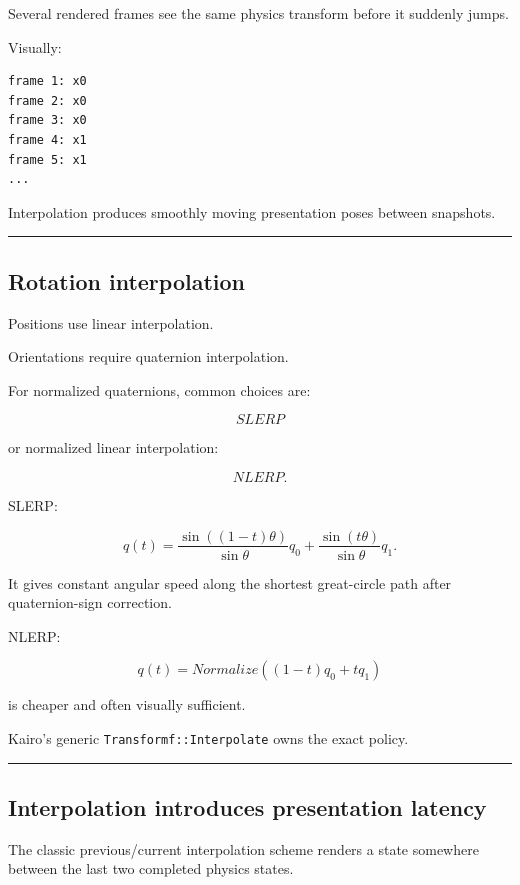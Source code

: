 Several rendered frames see the same physics transform before it suddenly jumps.

Visually:

\begin{verbatim}
frame 1: x0
frame 2: x0
frame 3: x0
frame 4: x1
frame 5: x1
...
\end{verbatim}

Interpolation produces smoothly moving presentation poses between snapshots.

\begin{center}\rule{0.5\linewidth}{0.5pt}\end{center}

\subsection{Rotation interpolation}\label{06-engine-ii-ch037-rotation-interpolation}

Positions use linear interpolation.

Orientations require quaternion interpolation.

For normalized quaternions, common choices are:

\[
SLERP
\]

or normalized linear interpolation:

\[
NLERP.
\]

SLERP:

\[
q(t)
=
\frac{
\sin((1-t)\theta)
}{
\sin\theta
}q_0
+
\frac{
\sin(t\theta)
}{
\sin\theta
}q_1.
\]

It gives constant angular speed along the shortest great-circle path after quaternion-sign correction.

NLERP:

\[
q(t)
=
Normalize(
(1-t)q_0+tq_1
)
\]

is cheaper and often visually sufficient.

Kairo's generic \texttt{Transformf::Interpolate} owns the exact policy.

\begin{center}\rule{0.5\linewidth}{0.5pt}\end{center}

\subsection{Interpolation introduces presentation latency}\label{06-engine-ii-ch037-interpolation-introduces-presentation-latency}

The classic previous/current interpolation scheme renders a state somewhere between the last two completed physics states.

